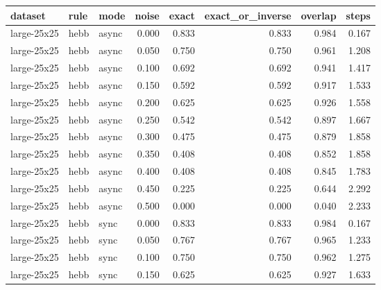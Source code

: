 \begin{tabular}{lllrrrrr}

\toprule

dataset & rule & mode & noise & exact & exact\_or\_inverse & overlap & steps \\

\midrule

large-25x25 & hebb & async & 0.000 & 0.833 & 0.833 & 0.984 & 0.167 \\

large-25x25 & hebb & async & 0.050 & 0.750 & 0.750 & 0.961 & 1.208 \\

large-25x25 & hebb & async & 0.100 & 0.692 & 0.692 & 0.941 & 1.417 \\

large-25x25 & hebb & async & 0.150 & 0.592 & 0.592 & 0.917 & 1.533 \\

large-25x25 & hebb & async & 0.200 & 0.625 & 0.625 & 0.926 & 1.558 \\

large-25x25 & hebb & async & 0.250 & 0.542 & 0.542 & 0.897 & 1.667 \\

large-25x25 & hebb & async & 0.300 & 0.475 & 0.475 & 0.879 & 1.858 \\

large-25x25 & hebb & async & 0.350 & 0.408 & 0.408 & 0.852 & 1.858 \\

large-25x25 & hebb & async & 0.400 & 0.408 & 0.408 & 0.845 & 1.783 \\

large-25x25 & hebb & async & 0.450 & 0.225 & 0.225 & 0.644 & 2.292 \\

large-25x25 & hebb & async & 0.500 & 0.000 & 0.000 & 0.040 & 2.233 \\

large-25x25 & hebb & sync & 0.000 & 0.833 & 0.833 & 0.984 & 0.167 \\

large-25x25 & hebb & sync & 0.050 & 0.767 & 0.767 & 0.965 & 1.233 \\

large-25x25 & hebb & sync & 0.100 & 0.750 & 0.750 & 0.962 & 1.275 \\

large-25x25 & hebb & sync & 0.150 & 0.625 & 0.625 & 0.927 & 1.633 \\


\end{tabular}
